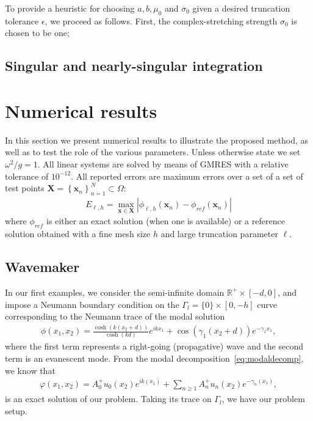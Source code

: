 \documentclass[11pt]{article}
\newcommand{\R}{\mathbb{R}}
\newcommand{\bx}{\mathbf{x}}
\begin{document}
To provide a heuristic for choosing $a,b,\mu_0$ and $\sigma_0$ given a desired
truncation tolerance $\epsilon$, we proceed as follows. First, the
complex-stretching strength $\sigma_0$ is chosen to be one; 

\subsection{Singular and nearly-singular integration} \label{sec:singular-integration}

\section{Numerical results}\label{sec:numerical-results}

In this section we present numerical results to illustrate the proposed method,
as well as to test the role of the various parameters. Unless otherwise state we
set $\omega^2/g =1$. All linear systems are solved by means of GMRES with a
relative tolerance of $10^{-12}$. All reported errors are maximum errors over a
set of a set of test points $\boldsymbol{X} = \left\{ \bx_n \right\}_{n=1}^N
\subset \Omega$:
\begin{align}
  E_{\ell,h} = \max_{\bx \in \boldsymbol{X}} |\phi_{\ell,h}(\bx_n) - \phi_{ref}(\bx_n) |
\end{align}
where $\phi_{ref}$ is either an exact solution (when one is available) or a
reference solution obtained with a fine mesh size $h$ and large truncation
parameter $\ell$. 

\subsection{Wavemaker}

In our first examples, we consider the semi-infinite domain $\R^+ \times [-d,0]$,
and impose a Neumann boundary condition on the $\Gamma_l = \{ 0 \} \times
[0,-h]$ curve corresponding to the Neumann trace of the modal solution
\begin{align}
  \phi(x_1,x_2) = \frac{\cosh(k(x_2+d))}{\cosh(kd)} e^{i k x_1} + \cos(\gamma_1(x_2+d)) e^{-\gamma_1 x_1},
\end{align}
where the first term represents a right-going (propagative) wave and the second
term is an evanescent mode. From the modal decomposition~\cref{eq:modaldecomp},
we know that
\begin{align}
  \varphi(x_1,x_2) = A_0^+u_0(x_2)e^{ik(x_1)} + \sum_{n\geq 1}A_n^+u_n(x_2)e^{-\gamma_n(x_1)},
\end{align}
is an exact solution of our problem. Taking its trace on $\Gamma_l$, we have our
problem setup.
\end{document}
